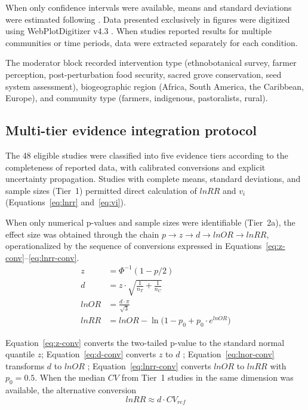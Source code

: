 \documentclass[12pt,a4paper]{article}
\begin{document}
\noindent When only confidence intervals were available, means and standard deviations were estimated following \citet{Betancur2022}. Data presented exclusively in figures were digitized using WebPlotDigitizer v4.3 \citep{Rohatgi2020}. When studies reported results for multiple communities or time periods, data were extracted separately for each condition.

The moderator block recorded intervention type (ethnobotanical survey, farmer perception, post-perturbation food security, sacred grove conservation, seed system assessment), biogeographic region (Africa, South America, the Caribbean, Europe), and community type (farmers, indigenous, pastoralists, rural).

\subsection{Multi-tier evidence integration protocol}
\label{sec:multitier}

The 48 eligible studies were classified into five evidence tiers according to the completeness of reported data, with calibrated conversions and explicit uncertainty propagation. Studies with complete means, standard deviations, and sample sizes (Tier~1) permitted direct calculation of $lnRR$ and $v_i$ (Equations~\ref{eq:lnrr} and~\ref{eq:vi}).

When only numerical p-values and sample sizes were identifiable (Tier~2a), the effect size was obtained through the chain $p \rightarrow z \rightarrow d \rightarrow lnOR \rightarrow lnRR$, operationalized by the sequence of conversions expressed in Equations~\ref{eq:z-conv}--\ref{eq:lnrr-conv}.
%
\begin{align}
z &= \Phi^{-1}(1 - p/2) \label{eq:z-conv} \\
d &= z \cdot \sqrt{\frac{1}{n_T} + \frac{1}{n_C}} \label{eq:d-conv} \\
lnOR &= \frac{d \cdot \pi}{\sqrt{3}} \label{eq:lnor-conv} \\
lnRR &= lnOR - \ln\!\bigl(1 - p_0 + p_0 \cdot e^{lnOR}\bigr) \label{eq:lnrr-conv}
\end{align}

\noindent Equation~\ref{eq:z-conv} converts the two-tailed p-value to the standard normal quantile $z$; Equation~\ref{eq:d-conv} converts $z$ to $d$ \citep{Borenstein2009}; Equation~\ref{eq:lnor-conv} transforms $d$ to $lnOR$ \citep{Hasselblad1995}; Equation~\ref{eq:lnrr-conv} converts $lnOR$ to $lnRR$ \citep{Zhang1998} with $p_0 = 0.5$. When the median $CV$ from Tier~1 studies in the same dimension was available, the alternative conversion
%
\begin{equation}
lnRR \approx d \cdot CV_{ref}
\label{eq:lnrr-cv}
\end{equation}
\end{document}
